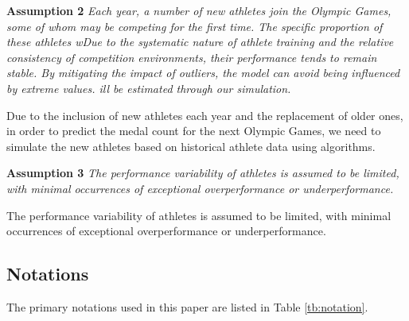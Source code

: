 \documentclass[12pt]{article}  %
\begin{document}
\textbf{Assumption 2 } \textit{Each year, a number of new athletes join the Olympic Games, some of whom may be competing for the first time. The specific proportion of these athletes wDue to the systematic nature of athlete training and the relative consistency of competition environments, their performance tends to remain stable. By mitigating the impact of outliers, the model can avoid being influenced by extreme values.  ill be estimated through our simulation. }

Due to the inclusion of new athletes each year and the replacement of older ones, in order to predict the medal count for the next Olympic Games, we need to simulate the new athletes based on historical athlete data using algorithms.


\textbf{Assumption 3} \textit{ The performance variability of athletes is assumed to be limited, with minimal occurrences of exceptional overperformance or underperformance.  }

The performance variability of athletes is assumed to be limited, with minimal occurrences of exceptional overperformance or underperformance.  


\subsection{Notations}

The primary notations used in this paper are listed in Table \ref{tb:notation}.

\end{document}
